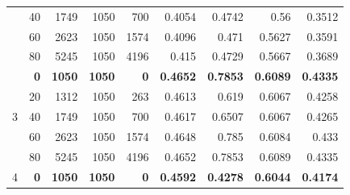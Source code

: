 \documentclass[a4paper]{llncs}
\begin{document}
\begin{table}[htbp!]
{\begin{tabular}{crrrrrrrr}
                                & 40                            & 1749                      & 1050                     & 700                        & 0.4054                     & 0.4742                        & 0.56                    & 0.3512                 \\
                                & 60                            & 2623                      & 1050                     & 1574                       & 0.4096                     & 0.471                         & 0.5627                  & 0.3591                 \\
                                & 80                            & 5245                      & 1050                     & 4196                       & 0.415                      & 0.4729                        & 0.5667                  & 0.3689                 \\ \hline
\multirow{5}{*}{3}              & \textbf{0}                    & \textbf{1050}             & \textbf{1050}            & \textbf{0}                 & \textbf{0.4652}            & \textbf{0.7853}               & \textbf{0.6089}         & \textbf{0.4335}        \\
                                & 20                            & 1312                      & 1050                     & 263                        & 0.4613                     & 0.619                         & 0.6067                  & 0.4258                 \\
                                & 40                            & 1749                      & 1050                     & 700                        & 0.4617                     & 0.6507                        & 0.6067                  & 0.4265                 \\
                                & 60                            & 2623                      & 1050                     & 1574                       & 0.4648                     & 0.785                         & 0.6084                  & 0.433                  \\
                                & 80                            & 5245                      & 1050                     & 4196                       & 0.4652                     & 0.7853                        & 0.6089                  & 0.4335                 \\ \hline
\multirow{5}{*}{4}              & \textbf{0}                    & \textbf{1050}             & \textbf{1050}            & \textbf{0}                 & \textbf{0.4592}            & \textbf{0.4278}               & \textbf{0.6044}         & \textbf{0.4174}        \\

\end{tabular}}
\end{table}
\end{document}
